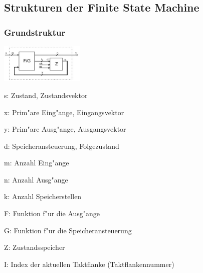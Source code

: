 \subsection{Strukturen der Finite State Machine}
	\begin{multicols}{3}
		\subsubsection{Grundstruktur}
			\includegraphics[width=0.3\textwidth]{pics/seq_grundstruktur}
		\columnbreak
		
			\begin{compactitem}
				\item s: Zustand, Zustandsvektor
				\item x: Prim"are Eing"ange, Eingangsvektor
				\item y: Prim"are Ausg"ange, Ausgangsvektor
				\item d: Speicheransteuerung, Folgezustand
				\item m: Anzahl Eing"ange
				\item n: Anzahl Ausg"ange
				\item k: Anzahl Speicherstellen
				\item F: Funktion f"ur die Ausg"ange
				\item G: Funktion f"ur die Speicheransteuerung
				\item Z: Zustandsspeicher
				\item I: Index der aktuellen Taktflanke (Taktflankennummer)
			\end{compactitem}
	\end{multicols}
	
